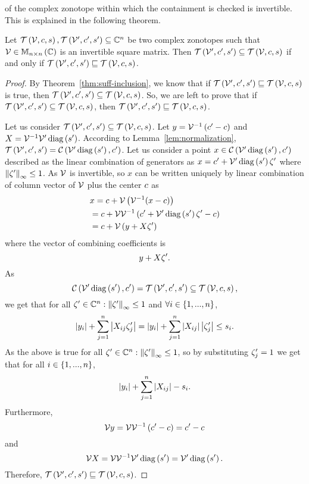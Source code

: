 of the complex zonotope within which the containment is checked is
invertible.  This is explained in the following theorem.
%
\begin{theorem}
Let
$\mathit{\operatorname{\mathcal{T}}}\left(\mathcal{V},c,s\right),\mathit{\operatorname{\mathcal{T}}}\left(\mathcal{V}^\prime,c^\prime,s^\prime\right)\subseteq\mathbb{C}^n$
be two complex zonotopes such that $\mathcal{V}\in\mathbb{M}_{n\times n}\left(\mathbb{C}\right)$ is
an invertible square matrix.  Then
$\mathit{\operatorname{\mathcal{T}}}\left(\mathcal{V}^\prime,c^\prime,s^\prime\right)\subseteq\mathit{\operatorname{\mathcal{T}}}\left(\mathcal{V},c,s\right)$
if and only if $\mathit{\operatorname{\mathcal{T}}}\left(\mathcal{V}^\prime,c^\prime,s^\prime\right)\sqsubseteq\mathit{\operatorname{\mathcal{T}}}\left(\mathcal{V},c,s\right)$.
\end{theorem}
%
\begin{proof}
By Theorem~\ref{thm:suff-inclusion}, we know that if
$\mathit{\operatorname{\mathcal{T}}}\left(\mathcal{V}^\prime,c^\prime,s^\prime\right)\sqsubseteq\mathit{\operatorname{\mathcal{T}}}\left(\mathcal{V},c,s\right)$
is true,
then
$\mathit{\operatorname{\mathcal{T}}}\left(\mathcal{V}^\prime,c^\prime,s^\prime\right)\subseteq\mathit{\operatorname{\mathcal{T}}}\left(\mathcal{V},c,s\right)$.
So, we are left to prove that if
$\mathit{\operatorname{\mathcal{T}}}\left(\mathcal{V}^\prime,c^\prime,s^\prime\right)\subseteq\mathit{\operatorname{\mathcal{T}}}\left(\mathcal{V},c,s\right)$,
then
$\mathit{\operatorname{\mathcal{T}}}\left(\mathcal{V}^\prime,c^\prime,s^\prime\right)\sqsubseteq\mathit{\operatorname{\mathcal{T}}}\left(\mathcal{V},c,s\right)$.

Let us consider
$\mathit{\operatorname{\mathcal{T}}}\left(\mathcal{V}^\prime,c^\prime,s^\prime\right)\subseteq\mathit{\operatorname{\mathcal{T}}}\left(\mathcal{V},c,s\right)$.
Let $y={\mathcal{V}}^{-1}\left(c^\prime-c\right)$ and
$X={\mathcal{V}}^{-1}\mathcal{V}^\prime\operatorname{diag}\left(s^\prime\right)$.  
According
to Lemma~\ref{lem:normalization},
$\mathit{\operatorname{\mathcal{T}}}\left(\mathcal{V}^\prime,c^\prime,s^\prime\right)=\mathit{\mathcal{C}}\left(\mathcal{V}^\prime\operatorname{diag}\left(s^\prime\right),c^\prime\right)$.
Let us consider a point
$x\in\mathit{\mathcal{C}}\left(\mathcal{V}^\prime\operatorname{diag}\left(s^\prime\right),c^\prime\right)$ described as the
linear combination of generators as
$x=c^\prime+\mathcal{V}^\prime\operatorname{diag}\left(s^\prime\right)\zeta^\prime$ where
$\left\|\zeta^\prime\right\|_{\infty}\leq 1$.  As $\mathcal{V}$ is invertible, so $x$ can be
written uniquely by linear combination of column vector of $\mathcal{V}$
plus the center $c$ as 
%
\begin{align*}
&
x=c+\mathcal{V}\left({\mathcal{V}}^{-1}(x-c)\right)\\
&
= c+\mathcal{V}{\mathcal{V}}^{-1}\left(c^\prime+\mathcal{V}^\prime\operatorname{diag}\left(s^\prime\right)\zeta^\prime-c\right)\\
& = c+\mathcal{V}\left(y+X\zeta^\prime\right)
\end{align*}
%
where the vector of combining coefficients is
%
\[
y+X\zeta^\prime.
\]
%
As
%
\[
\mathit{\mathcal{C}}\left(\mathcal{V}^\prime\operatorname{diag}\left(s^\prime\right),c^\prime\right)=\mathit{\operatorname{\mathcal{T}}}\left(\mathcal{V}^\prime,c^\prime,s^\prime\right)\subseteq\mathit{\operatorname{\mathcal{T}}}\left(\mathcal{V},c,s\right),
\]
%
we get that for all
$\zeta^\prime\in\mathbb{C}^n:\left\|\zeta^\prime\right\|_{\infty}\leq 1$ and $\forall i\in\left\{1,...,n\right\}$,
%
\[
\left|y_i\right|+\sum_{j=1}^n\left|X_{ij}\zeta^\prime_j\right|=\left|y_i\right|+\sum_{j=1}^n\left|X_{ij}\right|\left|\zeta^\prime_j\right|\leq s_i.
\]
%
As the above is true for all
$\zeta^\prime\in\mathbb{C}^n:\left\|\zeta^\prime\right\|_{\infty}\leq 1$, so by substituting
$\zeta^\prime_j=1$  we get that for all $i\in\left\{1,...,n\right\}$,
%
\[
\left|y_i\right|+\sum_{j=1}^n\left|X_{ij}\right|-s_i.
\]
%
Furthermore,
%
\[
\mathcal{V} y= \mathcal{V}{\mathcal{V}}^{-1}\left(c^\prime-c\right) = c^\prime-c
\]
%
and
\[
\mathcal{V} X=\mathcal{V}{\mathcal{V}}^{-1}\mathcal{V}^\prime\operatorname{diag}\left(s^\prime\right)=\mathcal{V}^\prime\operatorname{diag}\left(s^\prime\right).
\]
%
Therefore, $\mathit{\operatorname{\mathcal{T}}}\left(\mathcal{V}^\prime,c^\prime,s^\prime\right)\sqsubseteq\mathit{\operatorname{\mathcal{T}}}\left(\mathcal{V},c,s\right)$.
\end{proof}

